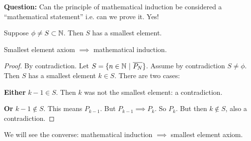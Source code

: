 \documentclass[twoside]{scrartcl}
\begin{document}
\textbf{Question:} Can the principle of mathematical induction be considered a ``mathematical statement'' i.e. can we prove it. Yes!\\


\begin{axiom}
Suppose $\phi \neq S \subset \mathbb{N}$. Then $S$ has a smallest element. 
\end{axiom}\vspace*{5pt}

\begin{proposition}
Smallest element axiom $\implies$ mathematical induction.	
\end{proposition}
\begin{proof}By contradiction. Let $S = \{n \in\mathbb{N} ~|~ \overline{P_N}\}$. Assume by contradiction $S \neq \phi$. Then $S$ has a smallest element $k \in S$. There are two cases: 

\textbf{Either} $k - 1 \in S$. Then $k$ was not the smallest element: a contradiction. 

\textbf{Or} $k-1 \not \in S$. This means $P_{k-1}$. But $P_{k-1} \implies P_k$. So $P_k$. But then $k \not \in S$, also a contradiction.	

\end{proof}

We will see the converse: mathematical induction $\implies$ smallest element axiom.\\
\end{document}
